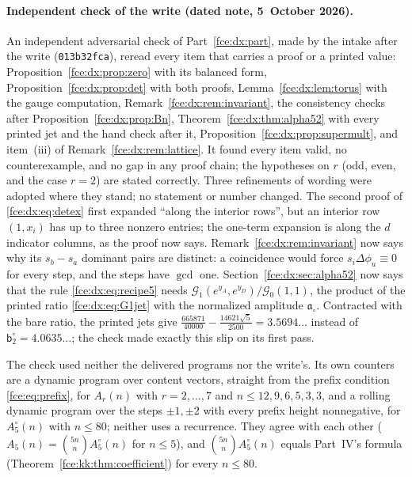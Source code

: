 \documentclass[11pt,a4paper]{article}
\numberwithin{equation}{section}
\theoremstyle{definition}\newtheorem{definition}[theorem]{Definition}
\theoremstyle{remark}\newtheorem{remark}[theorem]{Remark}
\begin{document}
\paragraph{Independent check of the write (dated note, 5~October 2026).}
An independent adversarial check of Part~\ref{fce:dx:part}, made by the intake
after the write (\texttt{013b32fca}), reread every item that carries a proof
or a printed value: Proposition~\ref{fce:dx:prop:zero} with its balanced form,
Proposition~\ref{fce:dx:prop:det} with both proofs,
Lemma~\ref{fce:dx:lem:torus} with the gauge computation,
Remark~\ref{fce:dx:rem:invariant}, the consistency checks after
Proposition~\ref{fce:dx:prop:Bn}, Theorem~\ref{fce:dx:thm:alpha52} with every
printed jet and the hand check after it,
Proposition~\ref{fce:dx:prop:supermult}, and item~(iii) of
Remark~\ref{fce:dx:rem:lattice}. It found every item valid, no
counterexample, and no gap in any proof chain; the hypotheses on $r$ (odd,
even, and the case $r=2$) are stated correctly. Three refinements of wording
were adopted where they stand; no statement or number changed. The second
proof of \eqref{fce:dx:eq:detex} first expanded ``along the interior rows'',
but an interior row $(1,x_i)$ has up to three nonzero entries; the one-term
expansion is along the $d$ indicator columns, as the proof now says.
Remark~\ref{fce:dx:rem:invariant} now says why its $s_b-s_a$ dominant pairs
are distinct: a coincidence would force $s_i\Delta\phi_u\equiv0$ for every
step, and the steps have $\gcd$ one. Section~\ref{fce:dx:sec:alpha52} now says
that the rule \eqref{fce:dx:eq:recipe5} needs
$\mathcal G_1(e^{y_A},e^{y_D})/\mathcal G_0(1,1)$, the product of the printed
ratio \eqref{fce:dx:eq:G1jet} with the normalized amplitude
$\mathfrak a_\circ$. Contracted with the bare ratio, the printed jets give
$\frac{665871}{40000}-\frac{14621\sqrt5}{2500}=3.5694\ldots$ instead of
$\mathsf b^\circ_2=4.0635\ldots$; the check made exactly this slip on its
first pass.

The check used neither the delivered programs nor the write's. Its own
counters are a dynamic program over content vectors, straight from the
prefix condition \eqref{fce:eq:prefix}, for $A_r(n)$ with $r=2,\ldots,7$ and
$n\le12,9,6,5,3,3$, and a rolling dynamic program over the steps $\pm1,\pm2$
with every prefix height nonnegative, for $A^\circ_5(n)$ with $n\le80$; neither
uses a recurrence. They agree with each other
($A_5(n)=\binom{5n}nA^\circ_5(n)$ for $n\le5$), and
$\binom{5n}nA^\circ_5(n)$ equals Part~IV's formula
(Theorem~\ref{fce:kk:thm:coefficient}) for every $n\le80$.
\end{document}
